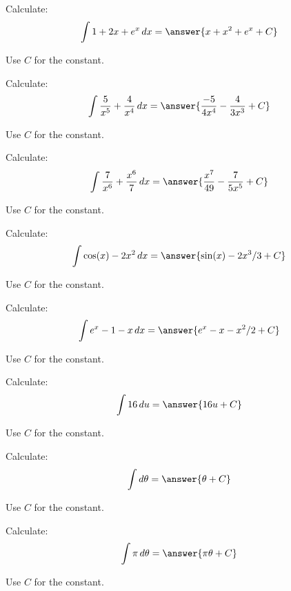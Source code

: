 \documentclass{ximera}
\begin{document}
\begin{problem} Calculate:
\[
\int 1+ 2x + e^x \d x = \answer{x + x^2 + e^x+C}
\]
\begin{hint}
  Use $C$ for the constant. 
\end{hint}
\end{problem}

\begin{problem} Calculate:
\[
\int \frac{5}{x^5} + \frac{4}{x^4} \d x = \answer{\frac{-5}{4 x^4}-\frac{4}{3 x^3}+C}
\]
\begin{hint}
  Use $C$ for the constant. 
\end{hint}
\end{problem}


\begin{problem} Calculate:
\[
\int \frac{7}{x^6} + \frac{x^6}{7} \d x = \answer{\frac{x^7}{49}-\frac{7}{5 x^5}+C}
\]
\begin{hint}
  Use $C$ for the constant. 
\end{hint}
\end{problem}


\begin{problem} Calculate:
\[
\int \cos(x) - 2x^2 \d x = \answer{\sin(x) - 2x^3/3+C}
\]
\begin{hint}
  Use $C$ for the constant. 
\end{hint}
\end{problem}

\begin{problem} Calculate:
\[
\int e^x - 1 - x \d x = \answer{e^x-x-x^2/2+C}
\]
\begin{hint}
  Use $C$ for the constant. 
\end{hint}
\end{problem}



\begin{problem} Calculate:
\[
\int 16 \d u = \answer{16u+C}
\]
\begin{hint}
  Use $C$ for the constant. 
\end{hint}
\end{problem}


\begin{problem} Calculate:
\[
\int  \d \theta = \answer{\theta+C}
\]
\begin{hint}
  Use $C$ for the constant. 
\end{hint}
\end{problem}

\begin{problem} Calculate:
\[
\int \pi \d \theta = \answer{\pi\theta +C}
\]
\begin{hint}
  Use $C$ for the constant. 
\end{hint}
\end{problem}
\end{document}
